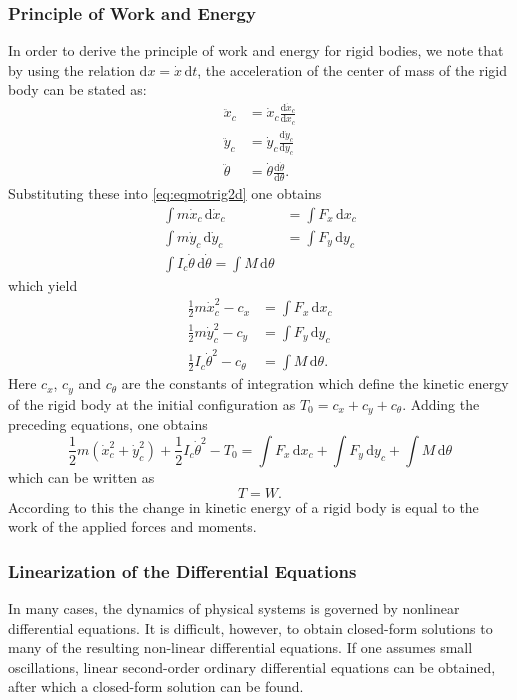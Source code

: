 \subsubsection{Principle of Work and Energy}
In order to derive the principle of work and energy for rigid bodies, we note that by using the relation $\mathrm{d}x = \dot{x} \, \mathrm{d}t $, the acceleration of the center of mass of the rigid body can be stated as:
\begin{align*}
  \ddot{x}_c &= \dot{x}_c \frac{\mathrm{d} \dot{x}_c}{\mathrm{d}x_c}  \\
  \ddot{y}_c &= \dot{y}_c \frac{\mathrm{d} \dot{y}_c}{\mathrm{d}y_c}  \\
  \ddot{\theta} &= \dot{\theta} \frac{\mathrm{d}\dot{\theta}}{\mathrm{d}\theta} 
.\end{align*}
Substituting these into \autoref{eq:eqmotrig2d} one obtains
\begin{align*}
  \int m \dot{x}_c \, \mathrm{d}\dot{x}_c &= \int F_x \, \mathrm{d}x_c \\
  \int m \dot{y}_c \, \mathrm{d}\dot{y}_c &= \int F_y \, \mathrm{d}y_c \\
  \int I_c \dot{\theta} \, \mathrm{d}\dot{\theta} = \int M \, \mathrm{d}\theta
\end{align*}
which yield
\begin{align*}
  \frac{1}{2} m \dot{x}_c^2 - c_x &= \int F_x \, \mathrm{d}x_c \\
  \frac{1}{2} m \dot{y}_c^2 - c_y &= \int F_y \, \mathrm{d}y_c \\
  \frac{1}{2} I_c \dot{\theta}^2 - c_{\theta} &= \int M \, \mathrm{d}\theta
.\end{align*}
Here $c_x$, $c_y$ and $c_{\theta}$ are the constants of integration which define the kinetic energy of the rigid body at the initial configuration as $T_0 = c_x + c_y + c_{\theta}$. Adding the preceding equations, one obtains
\[ 
  \frac{1}{2} m \left( \dot{x}_c^2 + \dot{y}_c^2 \right) + \frac{1}{2} I_{c} \dot{\theta}^2 - T_0 = \int F_x \, \mathrm{d}x_c + \int F_y \, \mathrm{d}y_c + \int M \, \mathrm{d}\theta
\]
which can be written as
\[ 
T = W
.\]
According to this the change in kinetic energy of a rigid body is equal to the work of the applied forces and moments. 

\subsubsection{Linearization of the Differential Equations}
In many cases, the dynamics of physical systems is governed by nonlinear differential equations. It is difficult, however, to obtain closed-form solutions to many of the resulting non-linear differential equations. If one assumes small oscillations, linear second-order ordinary differential equations can be obtained, after which a closed-form solution can be found.
